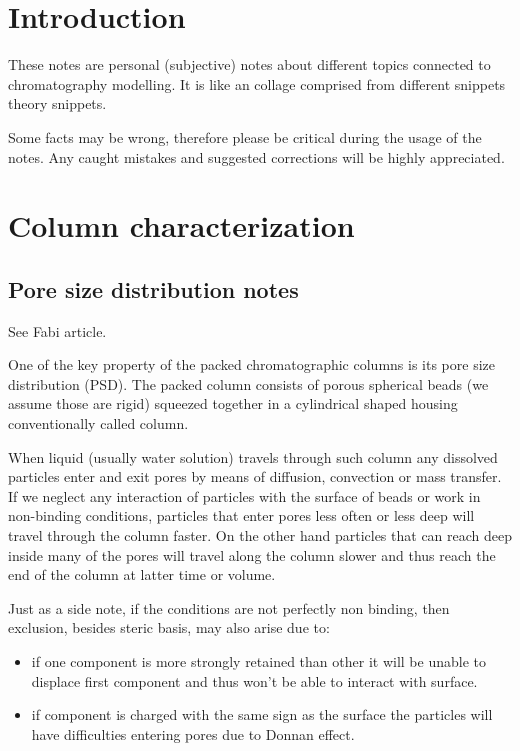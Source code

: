 \section{Introduction}

These notes are personal (subjective) notes about different topics connected to
chromatography modelling. It is like an collage comprised from different
snippets theory snippets.

Some facts may be wrong, therefore please be critical during the usage of the
notes. Any caught mistakes and suggested corrections will be highly appreciated.

\section{Column characterization}
\subsection{Pore size distribution notes}

See Fabi article.

One of the key property of the packed chromatographic columns is its pore size
distribution (PSD). The packed column consists of porous spherical beads (we
assume those are rigid) squeezed together in a cylindrical shaped housing
conventionally called column.

When liquid (usually water solution) travels through such column any
dissolved particles enter and exit pores by means of diffusion, convection or
mass transfer. If we neglect any interaction of particles with the surface of
beads or work in non-binding conditions, particles that enter pores less often
or less deep will travel through the column faster. On the other hand particles
that can reach deep inside many of the pores will travel along the column
slower and thus reach the end of the column at latter time or volume.

Just as a side note, if the conditions are not perfectly non binding, then
exclusion, besides steric basis, may also arise due to: 
\begin{itemize}
    \item if one component is more strongly retained than
    other it will be unable to displace first component and thus won't be able to
        interact with surface.
    \item if component is charged with the same sign as the surface the
        particles will have difficulties entering pores due to Donnan effect.
\end{itemize}

